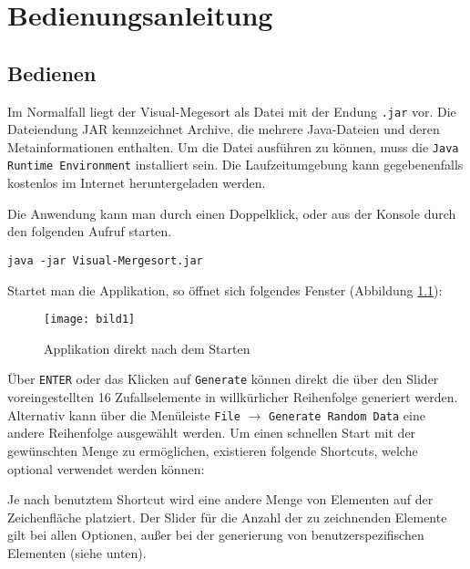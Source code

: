 \chapter{Bedienungsanleitung}\label{chap:bedienungsanleitung}


\section{Bedienen}

Im Normalfall liegt der Visual-Megesort als Datei mit der Endung \texttt{.jar} vor. Die Dateiendung JAR kennzeichnet Archive, die mehrere Java-Dateien und deren Metainformationen enthalten. Um die Datei ausführen zu können, muss die \texttt{Java Runtime Environment} installiert sein. Die Laufzeitumgebung kann gegebenenfalls kostenlos im Internet heruntergeladen werden.

Die Anwendung kann man durch einen Doppelklick, oder aus der Konsole durch den folgenden Aufruf starten.

\begin{verbatim}
java -jar Visual-Mergesort.jar
\end{verbatim}

Startet man die Applikation, so öffnet sich folgendes Fenster (Abbildung \ref{figure:start-app}):

\begin{figure}[!htb]
    \centering
      \texttt{[image: bild1]}
    \caption{Applikation direkt nach dem Starten}
    \label{figure:start-app}
\end{figure}

Über \texttt{ENTER} oder das Klicken auf \texttt{Generate} können direkt die über den Slider voreingestellten 16 Zufallselemente in willkürlicher Reihenfolge generiert werden. Alternativ kann über die Menüleiste \texttt{File} $\rightarrow$ \texttt{Generate Random Data} eine andere Reihenfolge ausgewählt werden. Um einen schnellen Start mit der gewünschten Menge zu ermöglichen, existieren folgende Shortcuts, welche optional verwendet werden können:

Je nach benutztem Shortcut wird eine andere Menge von Elementen auf der Zeichenfläche platziert. Der Slider für die Anzahl der zu zeichnenden Elemente gilt bei allen Optionen, außer bei der generierung von benutzerspezifischen Elementen (siehe unten).

